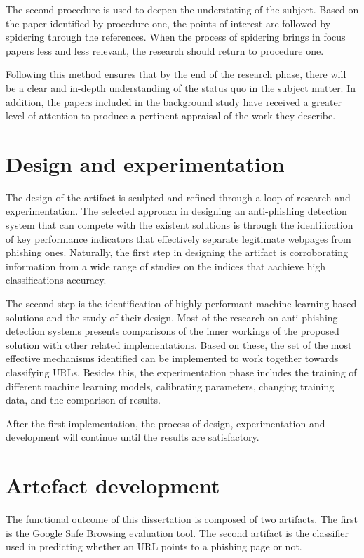 The second procedure is used to deepen the understating of the subject. Based on the paper identified by procedure one, the points of interest are followed by spidering through the references. When the process of spidering brings in focus papers less and less relevant, the research should return to procedure one.

Following this method ensures that by the end of the research phase, there will be a clear and in-depth understanding of the status quo in the subject matter. In addition, the papers included in the background study have received a greater level of attention to produce a pertinent appraisal of the work they describe.

\section{Design and experimentation}
The design of the artifact is sculpted and refined through a loop of research and experimentation. The selected approach in designing an anti-phishing detection system that can compete with the existent solutions is through the identification of key performance indicators that effectively separate legitimate webpages from phishing ones. Naturally, the first step in designing the artifact is corroborating information from a wide range of studies on the indices that aachieve high classifications accuracy. 

The second step is the identification of highly performant machine learning-based solutions and the study of their design. Most of the research on anti-phishing detection systems presents comparisons of the inner workings of the proposed solution with other related implementations. Based on these, the set of the most effective mechanisms identified can be implemented to work together towards classifying URLs. Besides this, the experimentation phase includes the training of different machine learning models, calibrating parameters, changing training data, and the comparison of results. 

After the first implementation, the process of design, experimentation and development will continue until the results are satisfactory.

\section{Artefact development}
The functional outcome of this dissertation is composed of two artifacts. The first is the Google Safe Browsing evaluation tool. The second artifact is the classifier used in predicting whether an URL points to a phishing page or not.

